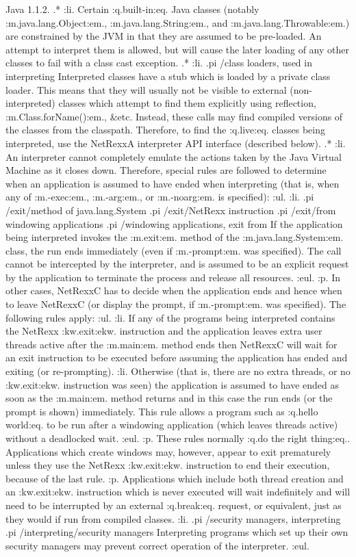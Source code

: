 Java 1.1.2.
.*
:li.
Certain :q.built-in:eq. Java classes
(notably :m.java.lang.Object:em., :m.java.lang.String:em.,
and :m.java.lang.Throwable:em.) are constrained by the JVM in that they
are assumed to be pre-loaded.  An attempt to interpret them is allowed,
but will cause the later loading of any other classes to fail with a
class cast exception.
.*
:li.
.pi /class loaders, used in interpreting
Interpreted classes have a stub which is loaded by a private class
loader.  This means that they will usually not be visible to external
(non-interpreted) classes which attempt to find them explicitly using
reflection, :m.Class.forName():em., &etc.  Instead, these calls may find
compiled versions of the classes from the classpath.  Therefore, to find
the :q.live:eq. classes being interpreted, use the NetRexxA interpreter
API interface (described below).
.*
:li.
An interpreter cannot completely emulate the actions taken by the Java
Virtual Machine as it closes down.  Therefore, special rules are
followed to determine when an application is assumed to have ended when
interpreting (that is, when any of :m.-exec:em., :m.-arg:em.,
or :m.-noarg:em. is specified):
:ul.
:li.
.pi /exit/method of java.lang.System
.pi /exit/NetRexx instruction
.pi /exit/from windowing applications
.pi /windowing applications, exit from
If the application being interpreted invokes the :m.exit:em. method of
the :m.java.lang.System:em. class, the run ends immediately (even
if :m.-prompt:em. was specified).  The call cannot be intercepted by the
interpreter, and is assumed to be an explicit request by the application
to terminate the process and release all resources.
:eul.
:p.
In other cases, NetRexxC has to decide when the application ends and
hence when to leave NetRexxC (or display the prompt, if :m.-prompt:em.
was specified).  The following rules apply:
:ul.
:li.
If any of the programs being interpreted contains the NetRexx
:kw.exit:ekw. instruction and the application leaves extra user threads
active after the :m.main:em. method ends then NetRexxC will wait for an
exit instruction to be executed before assuming the application has
ended and exiting (or re-prompting).
:li.
Otherwise (that is, there are no extra threads, or no :kw.exit:ekw.
instruction was seen) the application is assumed to have ended as soon
as the :m.main:em. method returns and in this case the run ends (or the
prompt is shown) immediately.  This rule allows a program such as
:q.hello world:eq. to be run after a windowing application (which leaves
threads active) without a deadlocked wait.
:eul.
:p.
These rules normally :q.do the right thing:eq..  Applications which
create windows may, however, appear to exit prematurely unless they use
the NetRexx :kw.exit:ekw. instruction to end their execution, because of
the last rule.
:p.
Applications which include both thread creation and an :kw.exit:ekw.
instruction which is never executed will wait indefinitely and will need
to be interrupted by an external :q.break:eq. request, or equivalent,
just as they would if run from compiled classes.
:li.
.pi /security managers, interpreting
.pi /interpreting/security managers
Interpreting programs which set up their own security managers may
prevent correct operation of the interpreter.
:eul.
